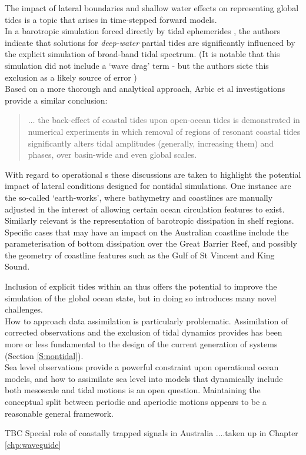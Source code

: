 The impact of lateral boundaries and shallow water effects on representing global tides is a topic that arises in time-stepped forward models.\\
In a barotropic simulation forced directly by tidal ephemerides \cite{Weis:2008ex}, the authors indicate that solutions for \emph{deep-water} partial tides are significantly influenced by the explicit simulation of broad-band tidal spectrum.   
(It is notable that this simulation did not include a `wave drag' term - but the authors sicte this exclusion as a likely source of error \citep[pp5]{Weis:2008ex})\\
Based on a more thorough and analytical approach, Arbic et al investigations provide a similar conclusion:
\noindent \begin{quotation}
$\dots{}$ the back-effect of coastal tides upon open-ocean tides is demonstrated in numerical experiments in which removal of regions of resonant coastal tides significantly alters tidal amplitudes (generally, increasing them) and phases, over basin-wide and even global scales.\citep[pp263]{Arbic:2009in}
\end{quotation}

With regard to operational \OGCM{}s these discussions are taken to highlight the potential impact of lateral conditions designed for nontidal simulations.  
One instance are the so-called `earth-works', where bathymetry and coastlines are manually adjusted in the interest of allowing certain ocean circulation features to exist.  
Similarly relevant is the representation of barotropic dissipation in shelf regions. 
Specific cases that may have an impact on the Australian coastline include the parameterisation of bottom dissipation over the Great Barrier Reef, and possibly the geometry of coastline features such as the Gulf of St Vincent and King Sound.




Inclusion of explicit tides within an \OGCM{} thus offers the potential to improve the simulation of the global ocean state, but in doing so introduces many novel challenges.\\
How to approach data assimilation is particularly problematic.  Assimilation of corrected observations and the exclusion of tidal dynamics provides has been more or less fundamental to the design of the current generation of \GODAE{} systems (Section \ref{S:nontidal}).\\
Sea level observations provide a powerful constraint upon operational ocean models, and how to assimilate sea level into models that dynamically include both mesoscale and tidal motions is an open question.   Maintaining the conceptual split between periodic and aperiodic motions appears to be a reasonable general framework.




TBC
Special role of coastally trapped signals in Australia  
....taken up in Chapter \ref{chp:waveguide}





